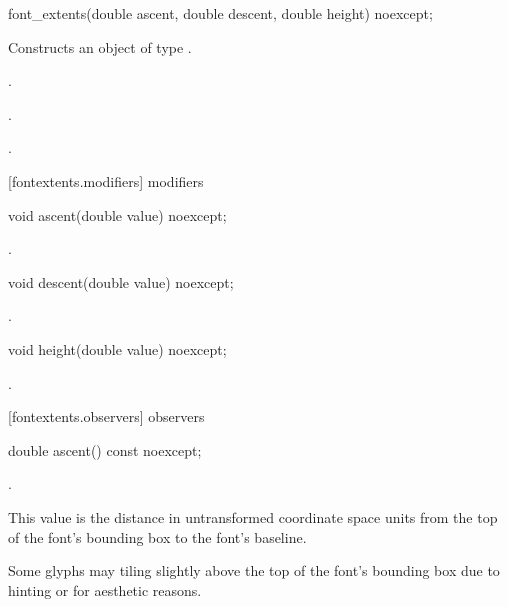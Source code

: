 \begin{itemdecl}
    font_extents(double ascent, double descent, double height) noexcept;
\end{itemdecl}
\begin{itemdescr}
	\pnum
	\effects
	Constructs an object of type .
	
	\pnum
	\postconditions
	.
	
	.
	
	.
\end{itemdescr}

 [fontextents.modifiers]{ modifiers}

\begin{itemdecl}
    void ascent(double value) noexcept;
\end{itemdecl}

\begin{itemdescr}
	\pnum
	\postconditions
	.
\end{itemdescr}

\begin{itemdecl}
    void descent(double value) noexcept;
\end{itemdecl}

\begin{itemdescr}
	\pnum
	\postconditions
	.
	
\end{itemdescr}

\begin{itemdecl}
    void height(double value) noexcept;
\end{itemdecl}

\begin{itemdescr}
	\pnum
	\postconditions
	.
	
\end{itemdescr}

 [fontextents.observers]{ observers}

\begin{itemdecl}
    double ascent() const noexcept;
\end{itemdecl}
\begin{itemdescr}
	\pnum
	\returns
	.
	
	\pnum
	\remarks
	This value is the distance in untransformed coordinate space units from the top of the font's bounding box to the font's baseline.
	
	\pnum
	Some glyphs may tiling slightly above the top of the font's bounding box due to hinting or for aesthetic reasons.

\end{itemdescr}


